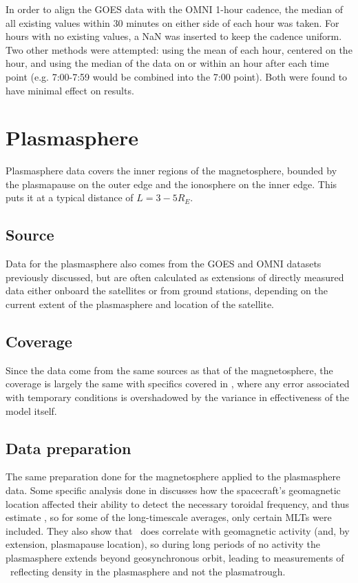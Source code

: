 In order to align the GOES data with the OMNI 1-hour cadence, the median of all existing values within 30 minutes on either side of each hour was taken. For hours with no existing values, a NaN was inserted to keep the cadence uniform. Two other methods were attempted: using the mean of each hour, centered on the hour, and using the median of the data on or within an hour after each time point (e.g. 7:00-7:59 would be combined into the 7:00 point). Both were found to have minimal effect on results.

\section{Plasmasphere}
Plasmasphere data covers the inner regions of the magnetosphere, bounded by the plasmapause on the outer edge and the ionosphere on the inner edge. This puts it at a typical distance of $L=3-5R_E$. 

\subsection{Source}
Data for the plasmasphere also comes from the GOES and OMNI datasets previously discussed, but are often calculated as extensions of directly measured data either onboard the satellites or from ground stations, depending on the current extent of the plasmasphere and location of the satellite.

\subsection{Coverage}
Since the data come from the same sources as that of the magnetosphere, the coverage is largely the same with specifics covered in \cite{Takahashi2010SolarCycleVariation}, where any error associated with temporary conditions is overshadowed by the variance in effectiveness of the model itself. 

\subsection{Data preparation}
The same preparation done for the magnetosphere applied to the plasmasphere data.  Some specific analysis done in \cite{Takahashi2010SolarCycleVariation} discusses how the spacecraft's geomagnetic location affected their ability to detect the necessary toroidal frequency, and thus estimate \req, so for some of the long-timescale averages, only certain MLTs were included. They also show that \req\ does correlate with geomagnetic activity (and, by extension, plasmapause location), so during long periods of no activity the plasmasphere extends beyond geosynchronous orbit, leading to measurements of \req\ reflecting density in the plasmasphere and not the plasmatrough. 
